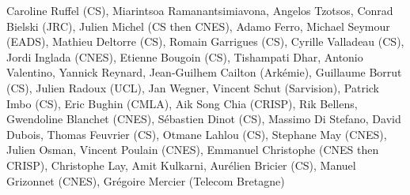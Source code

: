 Caroline Ruffel (CS), Miarintsoa Ramanantsimiavona, Angelos Tzotsos, Conrad Bielski (JRC), Julien Michel (CS then CNES), Adamo Ferro, Michael Seymour (EADS), Mathieu Deltorre (CS), Romain Garrigues (CS), Cyrille Valladeau (CS), Jordi Inglada (CNES), Etienne Bougoin (CS), Tishampati Dhar, Antonio Valentino, Yannick Reynard, Jean-Guilhem Cailton (Ark\'emie), Guillaume Borrut (CS), Julien Radoux (UCL), Jan Wegner, Vincent Schut (Sarvision), Patrick Imbo (CS), Eric Bughin (CMLA), Aik Song Chia (CRISP), Rik Bellens, Gwendoline Blanchet (CNES), S\'ebastien Dinot (CS), Massimo Di Stefano, David Dubois, Thomas Feuvrier (CS), Otmane Lahlou (CS), Stephane May (CNES), Julien Osman, Vincent Poulain (CNES), Emmanuel Christophe (CNES then CRISP), Christophe Lay, Amit Kulkarni, Aur\'elien Bricier (CS), Manuel Grizonnet (CNES), Gr\'egoire Mercier (Telecom Bretagne)